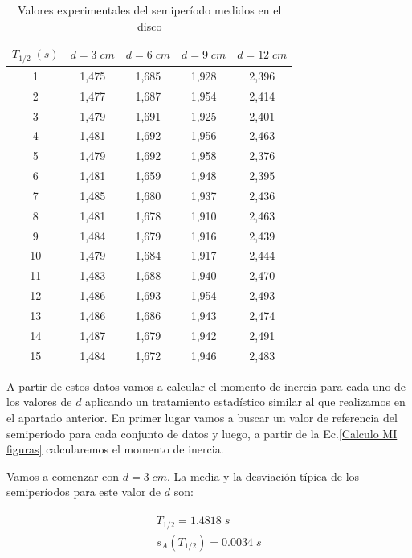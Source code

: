 \documentclass[a4paper,12pt,titlepage]{article}
\begin{document}
\begin{table}[h!]
    \centering
    \begin{tabular}{|c|c|c|c|c|}
    \hline
    $T_{1/2} \; (s)$ &$d=3 \; cm$ & $d=6 \;cm$ & $d=9 \; cm$ & $d=12 \; cm$ \\ \hline
    1  & 1,475 & 1,685 & 1,928 & 2,396 \\ \hline
    2  & 1,477 & 1,687 & 1,954 & 2,414 \\ \hline
    3  & 1,479 & 1,691 & 1,925 & 2,401 \\ \hline
    4  & 1,481 & 1,692 & 1,956 & 2,463 \\ \hline
    5  & 1,479 & 1,692 & 1,958 & 2,376 \\ \hline
    6  & 1,481 & 1,659 & 1,948 & 2,395 \\ \hline
    7  & 1,485 & 1,680 & 1,937 & 2,436 \\ \hline
    8  & 1,481 & 1,678 & 1,910 & 2,463 \\ \hline
    9  & 1,484 & 1,679 & 1,916 & 2,439 \\ \hline
    10 & 1,479 & 1,684 & 1,917 & 2,444 \\ \hline
    11 & 1,483 & 1,688 & 1,940 & 2,470 \\ \hline
    12 & 1,486 & 1,693 & 1,954 & 2,493 \\ \hline
    13 & 1,486 & 1,686 & 1,943 & 2,474 \\ \hline
    14 & 1,487 & 1,679 & 1,942 & 2,491 \\ \hline
    15 & 1,484 & 1,672 & 1,946 & 2,483 \\ \hline
    \end{tabular}
    \caption{Valores experimentales del semiperíodo medidos en el disco}
    \label{semiT Steiner1}
    \end{table}


A partir de estos datos vamos a calcular el momento de inercia para cada uno de los valores de $d$ aplicando un tratamiento estadístico similar al que realizamos en el apartado anterior. En primer lugar vamos a buscar un valor de referencia del semiperíodo para cada conjunto de datos y luego, a partir de la Ec.\ref{Calculo MI figuras} calcularemos el momento de inercia.

\par Vamos a comenzar con $d=3\; cm$. La media y la desviación típica de los semiperíodos para este valor de $d$ son:

\begin{equation}
    \begin{gathered}
        \overline{T}_{1/2} = 1.4818\; s \\
        s_A(T_{1/2}) =  0.0034 \; s
    \end{gathered}
\end{equation}
\end{document}
